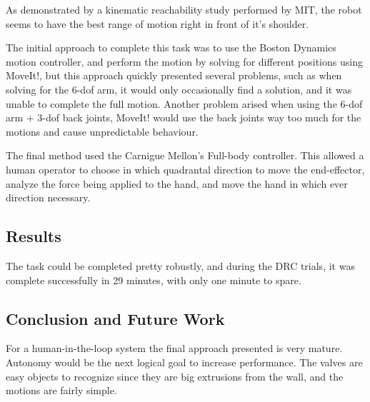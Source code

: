 \documentclass{article}
\begin{document}
As demonstrated by a kinematic reachability study performed by MIT, the robot seems to have the best range of motion right in front of it's shoulder. \cite{mitaffordance} 

The initial approach to complete this task was to use the Boston Dynamics motion controller, and perform the motion by solving for different positions using MoveIt!, but this approach quickly presented several problems, such as when solving for the 6-dof arm, it would only occasionally find a solution, and it was unable to complete the full motion. Another problem arised when using the 6-dof arm + 3-dof back joints, MoveIt! would use the back joints way too much for the motions and cause unpredictable behaviour. 

The final method used the Carnigue Mellon's Full-body controller. This allowed a human operator to choose in which quadrantal direction to move the end-effector, analyze the force being applied to the hand, and move the hand in which ever direction necessary. 

\subsection{Results}
The task could be completed pretty robustly, and during the DRC trials, it was complete successfully in 29 minutes, with only one minute to spare. 

\subsection{Conclusion and Future Work}

For a human-in-the-loop system the final approach presented is very mature. Autonomy would be the next logical goal to increase performance. The valves are easy objects to recognize since they are big extrusions from the wall, and the motions are fairly simple. 
\end{document}
